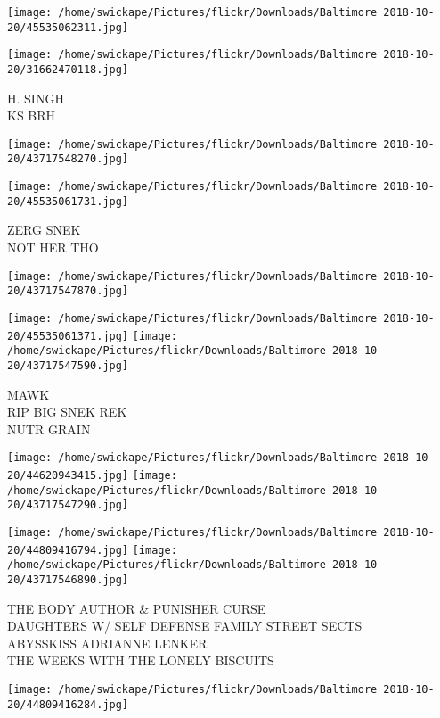 \documentclass[10pt,letterpaper]{article}
\begin{document}
\texttt{[image: /home/swickape/Pictures/flickr/Downloads/Baltimore 2018-10-20/45535062311.jpg]}

\vspace{0.25in}
\texttt{[image: /home/swickape/Pictures/flickr/Downloads/Baltimore 2018-10-20/31662470118.jpg]}

H. SINGH\\
KS BRH
\pagebreak

\texttt{[image: /home/swickape/Pictures/flickr/Downloads/Baltimore 2018-10-20/43717548270.jpg]}

\vspace{0.25in}
\texttt{[image: /home/swickape/Pictures/flickr/Downloads/Baltimore 2018-10-20/45535061731.jpg]}

ZERG SNEK\\
NOT HER THO
\pagebreak

\texttt{[image: /home/swickape/Pictures/flickr/Downloads/Baltimore 2018-10-20/43717547870.jpg]}

\vspace{0.25in}
\texttt{[image: /home/swickape/Pictures/flickr/Downloads/Baltimore 2018-10-20/45535061371.jpg]}
\texttt{[image: /home/swickape/Pictures/flickr/Downloads/Baltimore 2018-10-20/43717547590.jpg]}

MAWK\\
RIP BIG SNEK REK\\
NUTR GRAIN
\pagebreak

\texttt{[image: /home/swickape/Pictures/flickr/Downloads/Baltimore 2018-10-20/44620943415.jpg]}
\texttt{[image: /home/swickape/Pictures/flickr/Downloads/Baltimore 2018-10-20/43717547290.jpg]}

\texttt{[image: /home/swickape/Pictures/flickr/Downloads/Baltimore 2018-10-20/44809416794.jpg]}
\texttt{[image: /home/swickape/Pictures/flickr/Downloads/Baltimore 2018-10-20/43717546890.jpg]}

THE BODY AUTHOR \& PUNISHER CURSE\\
DAUGHTERS W/ SELF DEFENSE FAMILY STREET SECTS\\
ABYSSKISS ADRIANNE LENKER\\
THE WEEKS WITH THE LONELY BISCUITS
\pagebreak

\texttt{[image: /home/swickape/Pictures/flickr/Downloads/Baltimore 2018-10-20/44809416284.jpg]}
\end{document}
